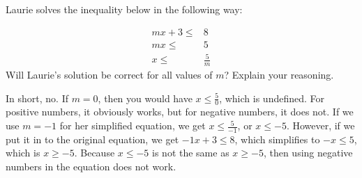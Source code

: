 \documentclass[a4paper]{article}
\begin{document}
Laurie solves the inequality below in the following way:

\begin{align*}
mx+3\le& 8\\
mx\le&5\\
x\le&\frac{5}{m}
\end{align*}
Will Laurie's solution be correct for all values of $m$? Explain your reasoning.

In short, no. If $m=0$, then you would have $x\le \frac{5}{0}$, which is undefined. For positive numbers, it obviously works, but for negative numbers, it does not. If we use $m=-1$ for her simplified equation, we get $x\le\frac{5}{-1}$, or $x\le-5$. However, if we put it in to the original equation, we get $-1x+3\le 8$, which simplifies to $-x\le 5$, which is $x\ge-5$. Because $x\le-5$ is not the same as $x\ge-5$, then using negative numbers in the equation does not work.
\end{document}
